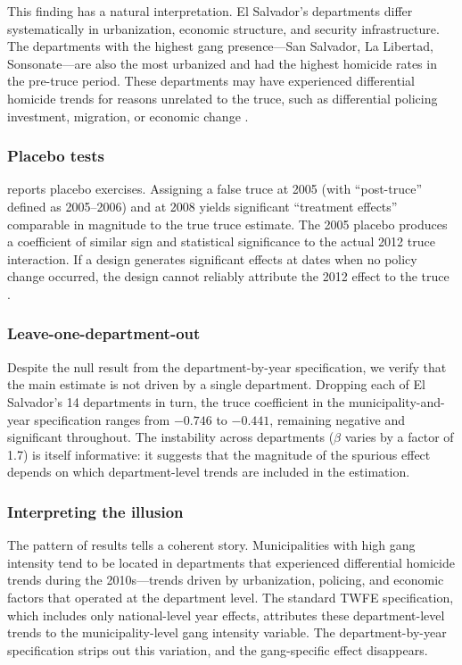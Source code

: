 \documentclass[12pt]{article}
\begin{document}
This finding has a natural interpretation. El Salvador's departments differ systematically in urbanization, economic structure, and security infrastructure. The departments with the highest gang presence---San Salvador, La Libertad, Sonsonate---are also the most urbanized and had the highest homicide rates in the pre-truce period. These departments may have experienced differential homicide trends for reasons unrelated to the truce, such as differential policing investment, migration, or economic change \citep{calderon_etal2015, castillo_etal2020}.

\subsubsection*{Placebo tests}  reports placebo exercises. Assigning a false truce at 2005 (with ``post-truce'' defined as 2005--2006) and at 2008 yields significant ``treatment effects'' comparable in magnitude to the true truce estimate. The 2005 placebo produces a coefficient of similar sign and statistical significance to the actual 2012 truce interaction. If a design generates significant effects at dates when no policy change occurred, the design cannot reliably attribute the 2012 effect to the truce \citep{bertrand_etal2004}.

\subsubsection*{Leave-one-department-out} Despite the null result from the department-by-year specification, we verify that the main estimate is not driven by a single department. Dropping each of El Salvador's 14 departments in turn, the truce coefficient in the municipality-and-year specification ranges from $-0.746$ to $-0.441$, remaining negative and significant throughout. The instability across departments ($\beta$ varies by a factor of 1.7) is itself informative: it suggests that the magnitude of the spurious effect depends on which department-level trends are included in the estimation.

\begin{table}[H]

\label{tab:robustness}
\end{table}

\subsubsection*{Interpreting the illusion} The pattern of results tells a coherent story. Municipalities with high gang intensity tend to be located in departments that experienced differential homicide trends during the 2010s---trends driven by urbanization, policing, and economic factors that operated at the department level. The standard TWFE specification, which includes only national-level year effects, attributes these department-level trends to the municipality-level gang intensity variable. The department-by-year specification strips out this variation, and the gang-specific effect disappears.
\end{document}
